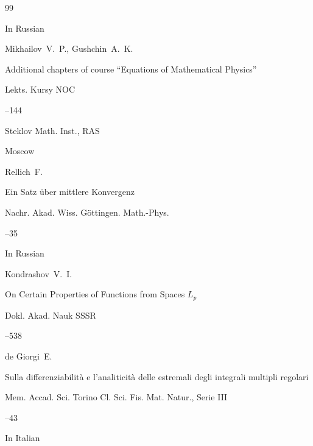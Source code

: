 \begin{thebibliography}{99}

\lang In Russian

\by Mikhailov~V.~P., Gushchin~A.~K.

\paper Additional chapters of course ``Equations of Mathematical Physics''

\serial Lekts. Kursy NOC



--144

\publ Steklov Math. Inst., RAS

\publaddr Moscow







\by Rellich~F.

\paper Ein Satz \"uber mittlere Konvergenz

\jour Nachr. Akad. Wiss. G\"ottingen. Math.-Phys.



--35





\lang In Russian

\by Kondrashov~V.~I.

\paper On Certain Properties of Functions from Spaces $L_p$

\jour Dokl. Akad. Nauk SSSR



--538






\by de Giorgi~E.

\paper Sulla differenziabilit\`a e l'analiticit\`a delle estremali degli integrali multipli regolari

\jour Mem. Accad. Sci. Torino Cl. Sci. Fis. Mat. Natur.\rm, Serie III



--43

\lang In Italian



\end{thebibliography}
